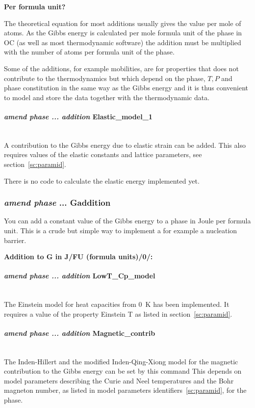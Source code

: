 \documentclass[11pt]{article}
\newcommand{\subsubsubsection}[1]{\paragraph{#1}\mbox{}\\}
\begin{document}
\hypertarget{Add per formula unit}{{\bf Per formula unit?}}

The theoretical equation for most additions usually gives the value
per mole of atoms.  As the Gibbs energy is calculated per mole formula
unit of the phase in OC (as well as most thermodynamic software) the
addition must be multiplied with the number of atoms per formula unit
of the phase.

Some of the additions, for example mobilities, are for properties that
does not contribute to the thermodynamics but which depend on the
phase, $T, P$ and phase constitution in the same way as the Gibbs
energy and it is thus convenient to model and store the data together
with the thermodynamic data.


\hypertarget{Amend elastic-model-1}{}
\subsubsubsection{{\em amend phase ... addition} Elastic\_model\_1}

A contribution to the Gibbs energy due to elastic strain can be added.
This also requires values of the elastic constants and lattice
parameters, see section~\ref{sc:paramid}.  

There is no code to calculate the elastic energy implemented yet.

\hypertarget{Amend Gaddition}{}
\subsubsection{{\em amend phase} ... Gaddition}

You can add a constant value of the Gibbs energy to a phase in Joule
per formula unit.  This is a crude but simple way to implement a for
example a nucleation barrier.

{\bf Addition to G in J/FU (formula units)/0/:}

\hypertarget{Amend lowt-Cp-model}{}
\subsubsubsection{{\em amend phase ... addition} LowT\_Cp\_model}

The Einstein model for heat capacities from 0~K has been implemented.
It requires a value of the property Einstein T as listed in
section~\ref{sc:paramid}.

\hypertarget{Amend magnetism}{}
\subsubsubsection{{\em amend phase ... addition} Magnetic\_contrib}

The Inden-Hillert and the modified Inden-Qing-Xiong model for the
magnetic contribution to the Gibbs energy can be set by this command
This depends on model parameters describing the Curie and Neel
temperatures and the Bohr magneton number, as listed in model
parameters identifiers~\ref{sc:paramid}, for the phase.
\end{document}
